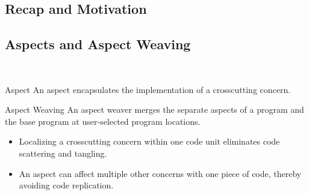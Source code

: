 \subsection{Recap and Motivation}


\subsection{Aspects and Aspect Weaving}

\begin{frame}{\myframetitle\ }
	\begin{fancycolumns}[animation=none]
		\begin{definition}{Aspect }
			An aspect encapsulates the implementation of a crosscutting concern.
		\end{definition}
		\begin{definition}{Aspect Weaving }
			An aspect weaver merges the separate aspects of a program and the base program at user-selected program locations.
		\end{definition}
		\begin{note}{}
			\begin{itemize}
				\item Localizing a crosscutting concern within one code unit eliminates code scattering and tangling.
				\item An aspect can affect multiple other concerns with one piece of code, thereby avoiding code replication.
			\end{itemize}
		\end{note}
	\nextcolumn
		\begin{exampletight}{}
			\centering
		\end{exampletight}
	\end{fancycolumns}
\end{frame}

